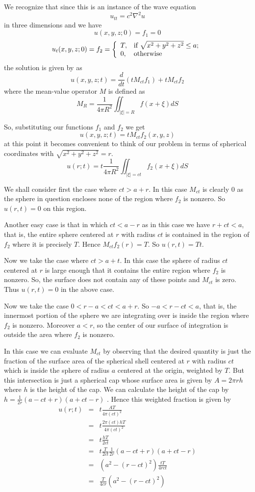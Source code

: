 \documentclass[12pt]{article}
\begin{document}
We recognize that since this is an instance of the wave equation 
\[u_{tt} = c^2 \nabla^2 u\]
in three dimensions and we have 
\[u(x,y,z;0)=f_1=0\]
\[u_t(x,y,z;0)=f_2=\left\{
\begin{array}{ll}
T, & $if $ \sqrt{x^2+y^2+z^2} \leq a; \\
0, & $otherwise$
\end{array}
\right.\]
the solution is  given by \cite[Page 326]{pinsky} as
\[ u(x,y,z;t)= \frac{d}{dt}(t M_{ct} f_1)+t M_{ct} f_2\]
where the mean-value operator $M$ is defined as
\[M_R=\frac{1}{4 \pi R^2} \iint_{|\xi|=R} f(x+\xi) dS\]

So, substituting our functions $f_1$ and $f_2$ we get
\[ u(x,y,z;t)= t M_{ct} f_2(x,y,z)\]
at this point it becomes convenient to think of our problem in terms of spherical coordinates with $\sqrt{x^2+y^2+z^2}=r$. 
\[ u(r;t)= t \frac{1}{4 \pi R^2} \iint_{|\xi|=c t} f_2(x+\xi) dS\]

We shall consider first the case where $ct>a+r$. In this case $M_{ct}$ is clearly $0$ as the sphere in question encloses none of the region where $f_2$ is nonzero. So $u(r,t)=0$ on this region.

Another easy case is that in which $ct< a-r$ as in this case we have $r + ct <a$, that is, the entire sphere centered at $r$ with radius $ct$ is contained in the region of $f_2$ where it is precisely $T$. Hence $M_{ct}f_2(r) = T$.  So $u(r,t) = T t$.

Now we take the case where $c t > a+t$. In this case the sphere of radius $c t$ centered at $r$ is large enough that it contains the entire region where $f_2$ is nonzero. So, the surface does not contain any of these points and $M_{ct}$ is zero. Thus $u(r,t)=0$ in the above case.

Now we take the case $0 < r-a < ct < a + r$. So $-a < r - ct < a$, that is, the innermost portion of the sphere we are integrating over is inside the region where $f_2$ is nonzero. Moreover $a < r$, so the center of our surface of integration is outside the area where $f_2$ is nonzero. 

In this case we can evaluate $M_{ct}$ by observing that the desired quantity is just the fraction of the surface area of the spherical shell centered at $r$ with radius $ct$ which is inside the sphere of radius $a$ centered at the origin, weighted by $T$. But this intersection is just a spherical cap \cite{sc} whose surface area is given by $A= 2\pi r h$ \cite{wikia} where $h$ is the height of the cap. We can calculate the height of the cap by $h=\frac{1}{2r} (a-c t+r)(a+c t -r)$ \cite{si} . Hence this weighted fraction is given by 
\begin{eqnarray*}
 u(r;t) &=& t \frac{A T}{4 \pi (c t)^2}\\
 &=& t \frac{ 2\pi (c t) h T}{4 \pi (c t)^2}\\
 &=& t \frac{   h T}{ 2 c t}\\
 &=& t \frac{   T}{ 2 c t} \frac{1}{2r} (a-c t+r)(a+c t -r)\\
 &=&  (a^2 - (r-c t)^2) \frac{  t T}{ 4 r c t}  \\
 &=&  \frac{   T}{ 4  c r}  (a^2 - (r-c t)^2)  \\
\end{eqnarray*}
\end{document}
